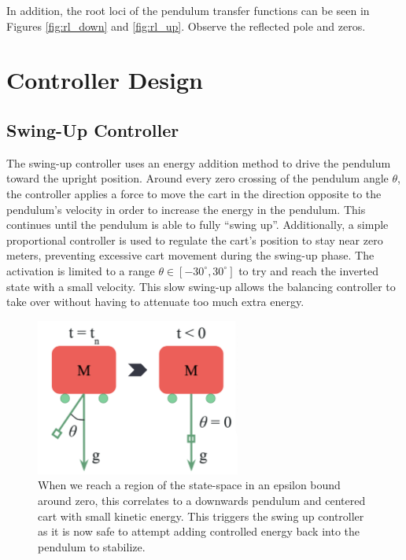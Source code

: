 \documentclass[12pt]{article}
\begin{document}
In addition, the root loci of the pendulum transfer functions can be seen in Figures \ref{fig:rl_down} and \ref{fig:rl_up}. Observe the reflected pole and zeros.



\section{Controller Design}

\subsection{Swing-Up Controller}
The swing-up controller uses an energy addition method to drive the pendulum toward the upright position.
Around every zero crossing of the pendulum angle $\theta$, the controller applies a force to move the cart in the direction opposite to the pendulum's velocity in order to increase the energy in the pendulum.
This continues until the pendulum is able to fully ``swing up''.
Additionally, a simple proportional controller is used to regulate the cart's position to stay near zero meters, preventing excessive cart movement during the swing-up phase.
The activation is limited to a range $\theta \in [-30^\circ,30^\circ]$ to try and reach the inverted state with a small velocity. This slow swing-up allows the balancing controller to take over without having to attenuate too much extra energy.


\begin{figure}[H]
    \centering
    \includegraphics[width=0.6\textwidth]{figures/swingup_activation.png}
    \caption{When we reach a region of the state-space in an epsilon bound around zero, this correlates to a downwards pendulum and centered cart with small kinetic energy. This triggers the swing up controller as it is now safe to attempt adding controlled energy back into the pendulum to stabilize.}
    \label{fig:swingup}
\end{figure}
\end{document}
